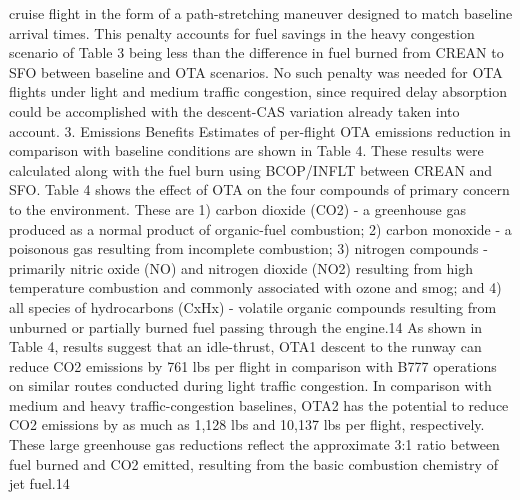 \documentclass{aer1315-pretty}
\begin{document}
\begin{itemize}
cruise flight in the form of a path-stretching maneuver designed to match baseline arrival times. This penalty
accounts for fuel savings in the heavy congestion scenario of Table 3 being less than the difference in fuel burned
from CREAN to SFO between baseline and OTA scenarios. No such penalty was needed for OTA flights under light
and medium traffic congestion, since required delay absorption could be accomplished with the descent-CAS
variation already taken into account.
    3.  Emissions Benefits
    Estimates of per-flight OTA emissions reduction in comparison with baseline conditions are shown in Table 4.
These results were calculated along with the fuel burn using BCOP/INFLT between CREAN and SFO. Table 4
shows the effect of OTA on the four compounds of primary concern to the environment. These are 1) carbon dioxide
(CO2) - a greenhouse gas produced as a normal product of organic-fuel combustion; 2) carbon monoxide - a
poisonous gas resulting from incomplete combustion; 3) nitrogen compounds - primarily nitric oxide (NO) and
nitrogen dioxide (NO2) resulting from high temperature combustion and commonly associated with ozone and
smog; and 4) all species of hydrocarbons (CxHx) - volatile organic compounds resulting from unburned or partially
burned fuel passing through the engine.14 As shown in Table 4, results suggest that an idle-thrust, OTA1 descent to
the runway can reduce CO2 emissions by 761 lbs per flight in comparison with B777 operations on similar routes
conducted during light traffic congestion. In comparison with medium and heavy traffic-congestion baselines, OTA2
has the potential to reduce CO2 emissions by as much as 1,128 lbs and 10,137 lbs per flight, respectively. These
large greenhouse gas reductions reflect the approximate 3:1 ratio between fuel burned and CO2 emitted, resulting
from the basic combustion chemistry of jet fuel.14




\end{itemize}
\end{document}
